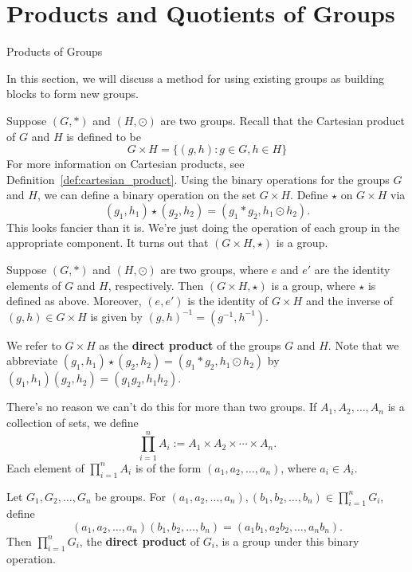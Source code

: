 \chapter{Products and Quotients of Groups}
\label{chapter:products_quotients}
\thispagestyle{empty}

\begin{section}{Products of Groups}

In this section, we will discuss a method for using existing groups as building blocks to form new groups.

Suppose $(G,*)$ and $(H,\odot)$ are two groups.  Recall that the Cartesian product of $G$ and $H$ is defined to be
\[
G\times H=\{(g,h):g\in G,h\in H\}
\]
For more information on Cartesian products, see Definition~\ref{def:cartesian_product}.  Using the binary operations for the groups $G$ and $H$, we can define a binary operation on the set $G\times H$.  Define $\star$ on $G\times H$ via
\[
(g_1,h_1)\star(g_2,h_2)=(g_1*g_2,h_1\odot h_2).
\]
This looks fancier than it is.  We're just doing the operation of each group in the appropriate component.  It turns out that $(G\times H,\star)$ is a group.

\begin{theorem}
Suppose $(G,*)$ and $(H,\odot)$ are two groups, where $e$ and $e'$ are the identity elements of $G$ and $H$, respectively.   Then $(G\times H,\star)$ is a group, where $\star$ is defined as above.  Moreover, $(e,e')$ is the identity of $G\times H$ and the inverse of $(g,h)\in G\times H$ is given by $(g,h)^{-1}=(g^{-1},h^{-1})$.
\end{theorem}

We refer to $G\times H$ as the \textbf{direct product} of the groups $G$ and $H$.  Note that we abbreviate $(g_1,h_1)\star(g_2,h_2)=(g_1*g_2,h_1\odot h_2)$ by $(g_1,h_1)(g_2,h_2)=(g_1 g_2,h_1 h_2)$.

There's no reason we can't do this for more than two groups.  If $A_1, A_2, \ldots, A_n$ is a collection of sets, we define
\[
\prod_{i=1}^nA_i:=A_1\times A_2\times \cdots \times A_n.
\]
Each element of $\prod_{i=1}^nA_i$ is of the form $(a_1,a_2,\ldots, a_n)$, where $a_i\in A_i$.

\begin{theorem}
Let $G_1, G_2,\ldots, G_n$ be groups.  For $(a_1,a_2, \ldots, a_n), (b_1,b_2,\ldots, b_n)\in \prod_{i=1}^nG_i$, define
\[
(a_1,a_2, \ldots, a_n)(b_1,b_2,\ldots, b_n)=(a_1b_1,a_2b_2,\ldots, a_nb_n).
\]
Then $\prod_{i=1}^nG_i$, the \textbf{direct product} of $G_i$, is a group under this binary operation.
\end{theorem}


\end{section}

